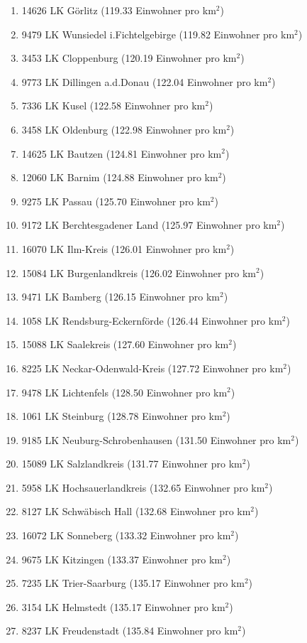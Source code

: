 \begin{enumerate}[itemsep=-6mm]
\item 14626 LK Görlitz (119.33 Einwohner pro km$^2$)
\item 9479 LK Wunsiedel i.Fichtelgebirge (119.82 Einwohner pro km$^2$)
\item 3453 LK Cloppenburg (120.19 Einwohner pro km$^2$)
\item 9773 LK Dillingen a.d.Donau (122.04 Einwohner pro km$^2$)
\item 7336 LK Kusel (122.58 Einwohner pro km$^2$)
\item 3458 LK Oldenburg (122.98 Einwohner pro km$^2$)
\item 14625 LK Bautzen (124.81 Einwohner pro km$^2$)
\item 12060 LK Barnim (124.88 Einwohner pro km$^2$)
\item 9275 LK Passau (125.70 Einwohner pro km$^2$)
\item 9172 LK Berchtesgadener Land (125.97 Einwohner pro km$^2$)
\item 16070 LK Ilm-Kreis (126.01 Einwohner pro km$^2$)
\item 15084 LK Burgenlandkreis (126.02 Einwohner pro km$^2$)
\item 9471 LK Bamberg (126.15 Einwohner pro km$^2$)
\item 1058 LK Rendsburg-Eckernförde (126.44 Einwohner pro km$^2$)
\item 15088 LK Saalekreis (127.60 Einwohner pro km$^2$)
\item 8225 LK Neckar-Odenwald-Kreis (127.72 Einwohner pro km$^2$)
\item 9478 LK Lichtenfels (128.50 Einwohner pro km$^2$)
\item 1061 LK Steinburg (128.78 Einwohner pro km$^2$)
\item 9185 LK Neuburg-Schrobenhausen (131.50 Einwohner pro km$^2$)
\item 15089 LK Salzlandkreis (131.77 Einwohner pro km$^2$)
\item 5958 LK Hochsauerlandkreis (132.65 Einwohner pro km$^2$)
\item 8127 LK Schwäbisch Hall (132.68 Einwohner pro km$^2$)
\item 16072 LK Sonneberg (133.32 Einwohner pro km$^2$)
\item 9675 LK Kitzingen (133.37 Einwohner pro km$^2$)
\item 7235 LK Trier-Saarburg (135.17 Einwohner pro km$^2$)
\item 3154 LK Helmstedt (135.17 Einwohner pro km$^2$)
\item 8237 LK Freudenstadt (135.84 Einwohner pro km$^2$)

\end{enumerate}
